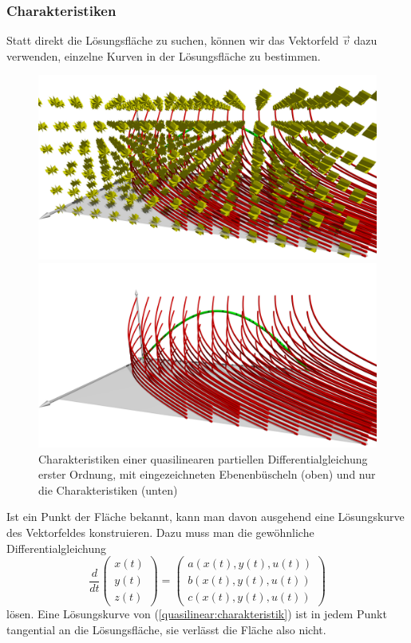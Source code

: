 \subsubsection{Charakteristiken}
Statt direkt die Lösungsfläche zu suchen, können wir das Vektorfeld
$\vec v$ dazu verwenden, einzelne Kurven in der Lösungsfläche
zu bestimmen.
\begin{figure}
\begin{center}
\includegraphics[width=\hsize]{../common/3d/chrpl.jpg}
\end{center}
\begin{center}
\includegraphics[width=\hsize]{../common/3d/chr.jpg}
\end{center}
\caption{Charakteristiken einer quasilinearen partiellen Differentialgleichung
erster Ordnung, mit eingezeichneten Ebenenbüscheln (oben) und nur die
Charakteristiken (unten)\label{geometrie:charekeristiken-mit-buescheln}}
\end{figure}
Ist ein Punkt der Fläche bekannt,
kann man davon ausgehend eine Lösungskurve des Vektorfeldes konstruieren.
Dazu muss man die gewöhnliche Differentialgleichung
\begin{equation}
\frac{d}{dt}\begin{pmatrix}x(t)\\y(t)\\z(t)\end{pmatrix}
=
\begin{pmatrix}
a(x(t),y(t),u(t))\\b(x(t),y(t),u(t))\\c(x(t),y(t),u(t))
\end{pmatrix}
\label{quasilinear:charakteristik}
\end{equation}
lösen.
Eine Lösungskurve von (\ref{quasilinear:charakteristik}) ist in jedem
Punkt tangential an die Lösungsfläche, sie verlässt die Fläche also
nicht.

